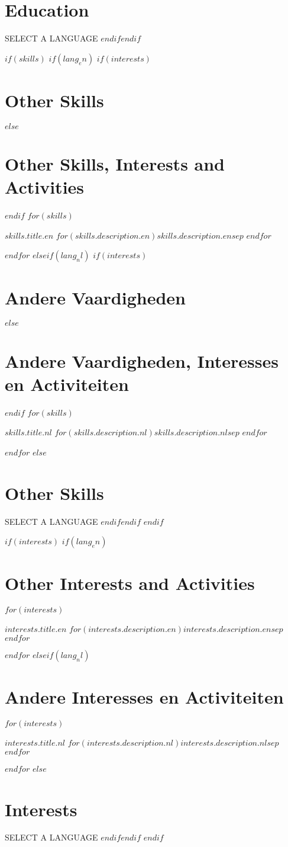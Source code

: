 \documentclass[11pt,letterpaper]{moderncv}
\renewcommand{\cvitem}[3][.25em]{%
  \begin{mycvlist}
    \item[#2] #3
    \end{mycvlist}
    \addvspace{#1}}
\begin{document}
	\section{Education}
	SELECT A LANGUAGE
$endif$$endif$

$if(skills)$
$if(lang_en)$
	$if(interests)$
		\section{Other Skills}
	$else$
		\section{Other Skills, Interests and Activities}
	$endif$
	$for(skills)$
		\cvitem{$skills.title.en$}
		{$for(skills.description.en)$$skills.description.en$$sep$ \medskip{}\newline{}
			$endfor$}
	$endfor$
$else$$if(lang_nl)$
	$if(interests)$
		\section{Andere Vaardigheden}
	$else$
		\section{Andere Vaardigheden, Interesses en Activiteiten}
	$endif$
	$for(skills)$
		\cvitem{$skills.title.nl$}
		{$for(skills.description.nl)$$skills.description.nl$$sep$ \medskip{}\newline{}
		 	 $endfor$}
	$endfor$
$else$
	\section{Other Skills}
	SELECT A LANGUAGE
$endif$$endif$
$endif$

$if(interests)$
$if(lang_en)$
	\section{Other Interests and Activities}
	$for(interests)$
		\cvitem{$interests.title.en$}
		{$for(interests.description.en)$$interests.description.en$$sep$ \medskip{}\newline{}
		 	 $endfor$}
	$endfor$
$else$$if(lang_nl)$
	\section{Andere Interesses en Activiteiten}
	$for(interests)$
		\cvitem{$interests.title.nl$}
		{$for(interests.description.nl)$$interests.description.nl$$sep$ \medskip{}\newline{}
		 	 $endfor$}
	$endfor$
$else$
	\section{Interests}
	SELECT A LANGUAGE
$endif$$endif$
$endif$
\end{document}
